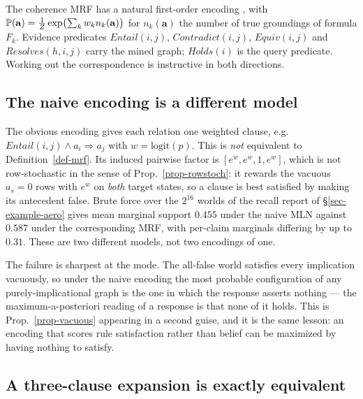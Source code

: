 The coherence MRF has a natural first-order encoding \citep{mln}, with
$\mathbb{P}\!\left( \mathbf{a} \right)=\tfrac1Z\exp\bigl(\sum_k w_k n_k(\mathbf{a})\bigr)$ for $n_k(\mathbf{a})$ the number of
true groundings of formula $F_k$. Evidence predicates $\mathit{Entail}(i,j)$,
$\mathit{Contradict}(i,j)$, $\mathit{Equiv}(i,j)$ and $\mathit{Resolves}(h,i,j)$ carry the mined graph;
$\mathit{Holds}(i)$ is the query predicate. Working out the correspondence is instructive in both
directions.

\subsection{The naive encoding is a different model}

The obvious encoding gives each relation one weighted clause, e.g.\
$\mathit{Entail}(i,j)\wedge a_i \Rightarrow a_j$ with $w=\mathrm{logit}(p)$. This is \emph{not}
equivalent to Definition~\ref{def-mrf}. Its induced pairwise factor is $[e^w,e^w,1,e^w]$, which is not
row-stochastic in the sense of Prop.~\ref{prop-rowstoch}: it rewards the vacuous $a_s=0$ rows with
$e^w$ on \emph{both} target states, so a clause is best satisfied by making its antecedent false.
Brute force over the $2^{16}$ worlds of the recall report of \S\ref{sec-example-aero} gives mean
marginal support $0.455$ under
the naive MLN against $0.587$ under the corresponding MRF, with per-claim marginals differing by up to
$0.31$. These are two different models, not two encodings of one.

The failure is sharpest at the mode. The all-false world satisfies every implication vacuously, so under
the naive encoding the most probable configuration of any purely-implicational graph is the one in which
the response asserts nothing --- the maximum-a-posteriori reading of a response is that none of it
holds. This is Prop.~\ref{prop-vacuous} appearing in a second guise, and it is the same lesson: an
encoding that scores rule satisfaction rather than belief can be maximized by having nothing to satisfy.

\subsection{A three-clause expansion is exactly equivalent}

